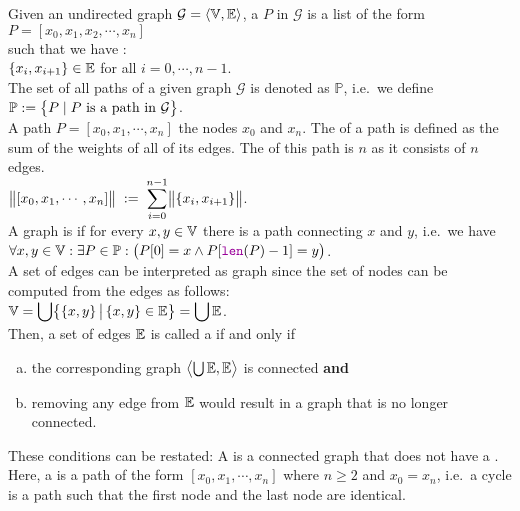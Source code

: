 \noindent
Given an undirected graph $\mathcal{G} = \langle {\mathbb V}, {\mathbb E} \rangle$, a  $P$
in $\mathcal{G}$ is a list of the form 
\\[0.2cm]
\hspace*{1.3cm} 
$P = [ x_0, x_1, x_2, \cdots, x_n ]$ 
\\[0.2cm]
such that we have : \\[0.2cm]
\hspace*{1.3cm}
$\{x_i,x_{i+1}\} \in {\mathbb E}$  \quad for all $i = 0, \cdots, n-1$.
\\[0.2cm]
The set of all paths of a given graph $\mathcal{G}$ is denoted as $\mathbb{P}$, i.e.~we define
\\[0.2cm]
\hspace*{1.3cm}
$\displaystyle \mathbb{P}  := \bigl\{ P \mid \mbox{$P$ is a path in $\mathcal{G}$} \bigr\}$.
\\[0.2cm]
A path $P = [ x_0, x_1, \cdots, x_n]$  the nodes $x_0$ and $x_n$.  The  of a
path is defined as
the sum of the weights of all of its edges.  The  of this path is $n$ as it consists of $n$ edges.
\\[0.2cm]
\hspace*{1.3cm}
 $\displaystyle\bigl\|[x_0,x_1, \cdots, x_n]\bigr\| \;:=\; \sum\limits_{i=0}^{n-1} \bigl\|\{x_i,x_{i+1}\}\bigr\|$. 
\\[0.2cm]
A graph is  if for every $x,y \in {\mathbb V}$ there is a path connecting $x$ and $y$, i.e.~we have
\\[0.2cm]
\hspace*{1.3cm}
$\forall x, y \in \mathbb{V}: \exists P \in \mathbb{P}: \bigl(P[0] = x \wedge P[\mytt{len}(P)-1] = y\bigr)$.
\\[0.2cm]
A set of edges can be interpreted as graph since the set of nodes can be computed from the edges as
follows: 
\\[0.2cm]
\hspace*{1.3cm}
$\displaystyle{\mathbb V} = \bigcup \bigl\{\{x,y\} \,\big|\, \{x,y\} \in {\mathbb E} \bigr\} = \bigcup {\mathbb E}$.
\\[0.2cm]
Then, a set of edges ${\mathbb E}$ is called a  if and only if
\begin{enumerate}[(a)]
\item the corresponding graph $\bigl\langle \bigcup {\mathbb E}, {\mathbb E}\bigr\rangle$ is connected \quad \textbf{and}
\item removing any edge from ${\mathbb E}$ would result in a graph that is no longer connected.
\end{enumerate}
These conditions can be restated: A  is a connected graph that does not have a .
Here, a  is a path of the form $[x_0, x_1, \cdots, x_n]$ where $n \geq 2$ and $x_0 = x_n$, i.e.~a
cycle is a path such that the first node and the last node are identical.

